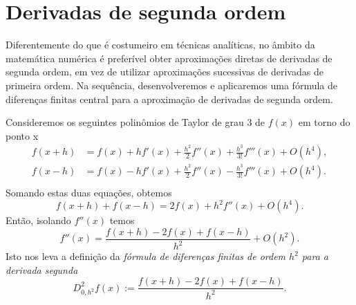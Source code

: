 \section{Derivadas de segunda ordem}\label{cap_deriv_sec_d2f}

Diferentemente do que é costumeiro em técnicas analíticas, no âmbito da matemática numérica é preferível obter aproximações diretas de derivadas de segunda ordem, em vez de utilizar aproximações sucessivas de derivadas de primeira ordem. Na sequência, desenvolveremos e aplicaremos uma fórmula de diferenças finitas central para a aproximação de derivadas de segunda ordem.

Consideremos os seguintes polinômios de Taylor de grau 3 de $f(x)$ em torno do ponto x
\begin{align}
  f(x+h) &= f(x) + hf'(x) + \frac{h^2}{2}f''(x) + \frac{h^3}{3!}f'''(x) + O(h^4),\\
  f(x-h) &= f(x) - hf'(x) + \frac{h^2}{2}f''(x) - \frac{h^3}{3!}f'''(x) + O(h^4).\\
\end{align}
Somando estas duas equações, obtemos
\begin{equation}
  f(x+h)+f(x-h) = 2f(x) + h^2f''(x) + O(h^4).
\end{equation}
Então, isolando $f''(x)$ temos
\begin{equation}
  f''(x) = \frac{f(x+h) - 2f(x) + f(x-h)}{h^2} + O(h^2).
\end{equation}
Isto nos leva a definição da \emph{fórmula de diferenças finitas de ordem $h^2$ para a derivada segunda}
\begin{equation}
  D_{0,h^2}^2 f(x) := \frac{f(x+h) - 2f(x) + f(x-h)}{h^2}.
\end{equation}

